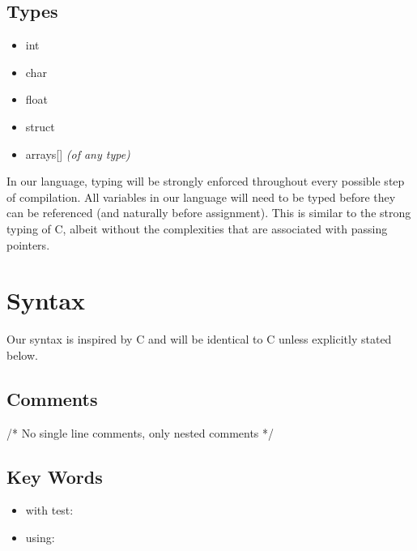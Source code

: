 \documentclass{article}
\begin{document}
\subsection{Types}
\begin{itemize}
	\item int
	\item char
	\item float
	\item struct
	\item arrays[] \textit{(of any type)}
\end{itemize}

In our language, typing will be strongly enforced throughout every possible step of compilation. All variables in our language will need to be typed before they can be referenced (and naturally before assignment). This is similar to the strong typing of C, albeit without the complexities that are associated with passing pointers.
\section{Syntax}
Our syntax is inspired by C and will be identical to C unless explicitly stated below.

\subsection{Comments}
/* No single line comments, only nested comments */

\subsection{Key Words}
\begin{itemize}
	\item
		with test: 
	\item
		using:
\end{itemize}

	
\end{document}
